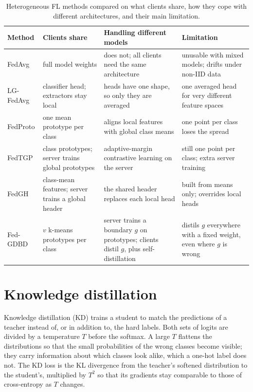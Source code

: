 \begin{table}[htbp]
\centering
\caption[Heterogeneous FL methods compared]{Heterogeneous FL methods compared on what clients share, how they cope with different architectures, and their main limitation.}
\label{tab:lit}
\small
\renewcommand{\arraystretch}{1.2}
\begin{tabularx}{\textwidth}{>{\raggedright\arraybackslash}p{2.2cm}>{\raggedright\arraybackslash}X>{\raggedright\arraybackslash}X>{\raggedright\arraybackslash}X}
\toprule
Method & Clients share & Handling different models & Limitation \\
\midrule
FedAvg \cite{mcmahan2017fedavg} & full model weights & does not; all clients need the same architecture & unusable with mixed models; drifts under non-IID data \\
LG-FedAvg \cite{liang2020lgfedavg} & classifier head; extractors stay local & heads have one shape, so only they are averaged & one averaged head for very different feature spaces \\
FedProto \cite{tan2022fedproto} & one mean prototype per class & aligns local features with global class means & one point per class loses the spread \\
FedTGP \cite{zhang2024fedtgp} & class prototypes; server trains global prototypes & adaptive-margin contrastive learning on the server & still one point per class; extra server training \\
FedGH \cite{yi2023fedgh} & class-mean features; server trains a global header & the shared header replaces each local head & built from means only; overrides local heads \\
Fed-GDBD \cite{zhang2025gdbd} & $v$ k-means prototypes per class & server trains a boundary $g$ on prototypes; clients distil $g$, plus self-distillation & distils $g$ everywhere with a fixed weight, even where $g$ is wrong \\
\bottomrule
\end{tabularx}
\end{table}

\section{Knowledge distillation}

Knowledge distillation (KD) \cite{hinton2015kd} trains a student to match the predictions of a teacher instead of, or in addition to, the hard labels. Both sets of logits are divided by a temperature $T$ before the softmax. A large $T$ flattens the distributions so that the small probabilities of the wrong classes become visible; they carry information about which classes look alike, which a one-hot label does not. The KD loss is the KL divergence from the teacher's softened distribution to the student's, multiplied by $T^2$ so that its gradients stay comparable to those of cross-entropy as $T$ changes.

